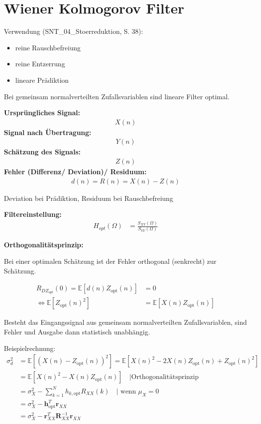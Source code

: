 \section{Wiener Kolmogorov Filter}

Verwendung (SNT\_04\_Stoerreduktion, S. 38):
\begin{itemize}
\item reine Rauschbefreiung
\item reine Entzerrung
\item lineare Prädiktion
\end{itemize}

Bei gemeinsam normalverteilten Zufallsvariablen sind lineare Filter optimal.


\textbf{Ursprüngliches Signal:}
\begin{align}
X(n)
\end{align}
\textbf{Signal nach Übertragung:}
\begin{align}
Y(n)
\end{align}
\textbf{Schätzung des Signals:}
\begin{align}
Z(n)
\end{align}
\textbf{Fehler (Differenz/ Deviation)/ Residuum:}
\begin{align}
d(n) = R(n) = X(n) - Z(n)
\end{align}

Deviation bei Prädiktion, Residuum bei Rauschbefreiung

\textbf{Filtereinstellung:}
\begin{align}
H_{opt}(\Omega) &= \frac{S_{XY}(\Omega)}{S_{YY}(\Omega)}
\end{align}


\textbf{Orthogonalitätsprinzip:}

Bei einer optimalen Schätzung ist der Fehler orthogonal (senkrecht) zur Schätzung.

\begin{align}
R_{DZ_{opt}}(0) = \mathbb{E}[d(n)Z_{\text{opt}}(n)] &= 0 \\
\Leftrightarrow \mathbb{E}[Z_{\text{opt}}(n)^2] &= \mathbb{E}[X(n) Z_{\text{opt}}(n)]
\end{align}

Besteht das Eingangssignal aus gemeinsam normalverteilten Zufallsvariablen, sind Fehler und Ausgabe dann statistisch unabhängig.

Beispielrechnung:
\begin{align}
\sigma_d^2 &= \mathbb{E}[(X(n)-Z_{\text{opt}}(n))^2]= \mathbb{E}[X(n)^2 - 2X(n)Z_{\text{opt}}(n) + Z_{\text{opt}}(n)^2] \\
&= \mathbb{E}[X(n)^2-X(n)Z_{\text{opt}}(n)] \quad \text{|Orthogonalitätsprinzip} \\
&= \sigma_X^2 - \sum_{k=1}^{N} h_{k,\text{opt}}R_{XX}(k)\quad \text{| wenn }\mu_X = 0 \\
&= \sigma_X^2 - \mathbf{h}_{\text{opt}}^T\mathbf{r}_{XX}\\
&= \sigma_X^2 - \mathbf{r}_{XX}^T\mathbf{R}_{XX}^{-1}\mathbf{r}_{XX}
\end{align}


